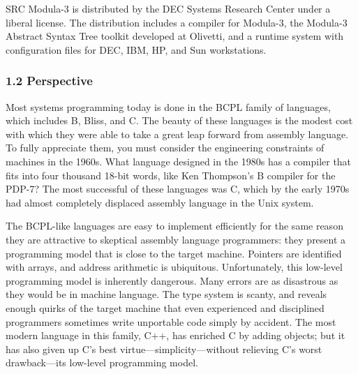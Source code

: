 \documentclass[10pt]{article}
\begin{document}
SRC Modula-3 is distributed by the DEC Systems Research Center under a liberal
license.  The distribution includes a compiler for Modula-3, the Modula-3
Abstract Syntax Tree toolkit developed at Olivetti, and a runtime system with
configuration files for DEC, IBM, HP, and Sun workstations.

\subsubsection*{1.2 Perspective}

Most systems programming today is done in the BCPL family of languages, which
includes B, Bliss, and C.  The beauty of these languages is the modest cost
with which they were able to take a great leap forward from assembly
language.  To fully appreciate them, you must consider the engineering
constraints of machines in the 1960s.  What language designed in the 1980s has
a compiler that fits into four thousand 18-bit words, like Ken Thompson's B
compiler for the PDP-7? The most successful of these languages was C, which by
the early 1970s had almost completely displaced assembly language in the Unix
system.

The BCPL-like languages are easy to implement efficiently for the same reason
they are attractive to skeptical assembly language programmers: they present a
programming model that is close to the target machine.  Pointers are identified
with arrays, and address arithmetic is ubiquitous.  Unfortunately, this
low-level programming model is inherently dangerous.  Many errors are as
disastrous as they would be in machine language.  The type system is scanty,
and reveals enough quirks of the target machine that even experienced and
disciplined programmers sometimes write unportable code simply by
accident.  The most modern language in this family, C++, has enriched C by
adding objects; but it has also given up C's best
virtue---simplicity---without relieving C's worst drawback---its low-level
programming model.
\end{document}
